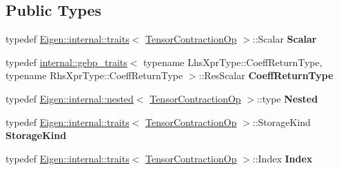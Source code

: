 \subsection*{Public Types}
\begin{DoxyCompactItemize}
\item 
\mbox{\label{class_eigen_1_1_tensor_contraction_op_ad71e40c21098c8ef448b43496b08a39c}} 
typedef \hyperlink{struct_eigen_1_1internal_1_1traits}{Eigen\+::internal\+::traits}$<$ \hyperlink{class_eigen_1_1_tensor_contraction_op}{Tensor\+Contraction\+Op} $>$\+::Scalar {\bfseries Scalar}
\item 
\mbox{\label{class_eigen_1_1_tensor_contraction_op_aa23288e0007b2689605fbcb8aae1801e}} 
typedef \hyperlink{class_eigen_1_1internal_1_1gebp__traits}{internal\+::gebp\+\_\+traits}$<$ typename Lhs\+Xpr\+Type\+::\+Coeff\+Return\+Type, typename Rhs\+Xpr\+Type\+::\+Coeff\+Return\+Type $>$\+::Res\+Scalar {\bfseries Coeff\+Return\+Type}
\item 
\mbox{\label{class_eigen_1_1_tensor_contraction_op_a61f4957b7c6b0d31750d909d65e3bcde}} 
typedef \hyperlink{struct_eigen_1_1internal_1_1nested}{Eigen\+::internal\+::nested}$<$ \hyperlink{class_eigen_1_1_tensor_contraction_op}{Tensor\+Contraction\+Op} $>$\+::type {\bfseries Nested}
\item 
\mbox{\label{class_eigen_1_1_tensor_contraction_op_a6d21e364994b36ff1684f4ca4980c4fe}} 
typedef \hyperlink{struct_eigen_1_1internal_1_1traits}{Eigen\+::internal\+::traits}$<$ \hyperlink{class_eigen_1_1_tensor_contraction_op}{Tensor\+Contraction\+Op} $>$\+::Storage\+Kind {\bfseries Storage\+Kind}
\item 
\mbox{\label{class_eigen_1_1_tensor_contraction_op_a83eae7a702b928e780f93d13449215eb}} 
typedef \hyperlink{struct_eigen_1_1internal_1_1traits}{Eigen\+::internal\+::traits}$<$ \hyperlink{class_eigen_1_1_tensor_contraction_op}{Tensor\+Contraction\+Op} $>$\+::Index {\bfseries Index}
\item 
\mbox{\label{class_eigen_1_1_tensor_contraction_op_ad71e40c21098c8ef448b43496b08a39c}} 

\end{DoxyCompactItemize}
